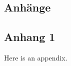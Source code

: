 

\begin{appendices}
\section*{Anhänge}
\renewcommand{\thesubsection}{\Alph{subsection}}

\subsection{Anhang 1}
\label{appx:appendix1}

Here is an appendix.

\end{appendices}